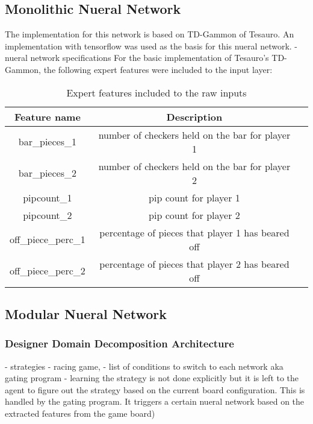 \documentclass[12pt,a4paper]{article}
\begin{document}
\subsection{Monolithic Nueral Network}
The implementation for this network is based on TD-Gammon of Tesauro. An implementation with tensorflow was used as the basis for this nueral network.  
- nueral network specifications
For the basic implementation of Tesauro's TD-Gammon, the following expert features were included to the input layer:
\begin{table}[htb]
    \centering
    \caption{Expert features included to the raw inputs}
    \vspace*{6pt}
    \label{exfeat}
    \begin{tabular}{ccc}
        \hline
        \hline
        Feature name & Description \\ 
        \hline
        bar\_pieces\_1 & number of checkers held on the bar for player 1 \\
        \hline
        bar\_pieces\_2 & number of checkers held on the bar for player 2 \\
        \hline
        pipcount\_1 & pip count for player 1 \\
        \hline
        pipcount\_2 & pip count for player 2 \\
        \hline
        off\_piece\_perc\_1 & percentage of pieces that player 1 has beared off \\
        \hline
        off\_piece\_perc\_2 & percentage of pieces that player 2 has beared off \\
        \hline
    \end{tabular}
\end{table}

\subsection{Modular Nueral Network} \label{modnet}
\subsubsection{Designer Domain Decomposition Architecture}
- strategies - racing game, 
- list of conditions to switch to each network aka gating program
- learning the strategy is not done explicitly but it is left to the agent to figure out the strategy based on the current board configuration. This is handled by the gating program. It triggers a certain nueral network based on the extracted features from the game board)
\end{document}
